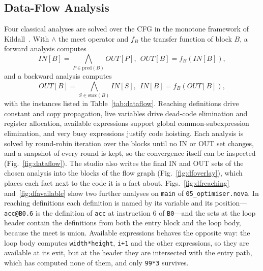 \documentclass[conference]{IEEEtran}
\newcommand{\code}[1]{\texttt{#1}}
\begin{document}
\subsection{Data-Flow Analysis}
Four classical analyses are solved over the CFG in the monotone framework of Kildall~\cite{kildall1973}. With $\wedge$ the meet operator and $f_B$ the transfer function of block $B$, a forward analysis computes
\begin{equation}
\mathit{IN}[B] = \bigwedge_{P \in \mathrm{pred}(B)} \mathit{OUT}[P],\ \ \mathit{OUT}[B] = f_B(\mathit{IN}[B]),
\label{eq:forward}
\end{equation}
and a backward analysis computes
\begin{equation}
\mathit{OUT}[B] = \bigwedge_{S \in \mathrm{succ}(B)} \mathit{IN}[S],\ \ \mathit{IN}[B] = f_B(\mathit{OUT}[B]),
\label{eq:backward}
\end{equation}
with the instances listed in Table~\ref{tab:dataflow}. Reaching definitions drive constant and copy propagation, live variables drive dead-code elimination and register allocation, available expressions support global common-subexpression elimination, and very busy expressions justify code hoisting. Each analysis is solved by round-robin iteration over the blocks until no IN or OUT set changes, and a snapshot of every round is kept, so the convergence itself can be inspected (Fig.~\ref{fig:dataflow}). The studio also writes the final IN and OUT sets of the chosen analysis into the blocks of the flow graph (Fig.~\ref{fig:dfoverlay}), which places each fact next to the code it is a fact about. Figs.~\ref{fig:dfreaching} and~\ref{fig:dfavailable} show two further analyses on \code{main} of \code{05\_optimiser.nova}. In reaching definitions each definition is named by its variable and its position---\code{acc@B0.6} is the definition of \code{acc} at instruction 6 of \code{B0}---and the sets at the loop header contain the definitions from both the entry block and the loop body, because the meet is union. Available expressions behaves the opposite way: the loop body computes \code{width*height}, \code{i+1} and the other expressions, so they are available at its exit, but at the header they are intersected with the entry path, which has computed none of them, and only \code{99*3} survives.
\end{document}
